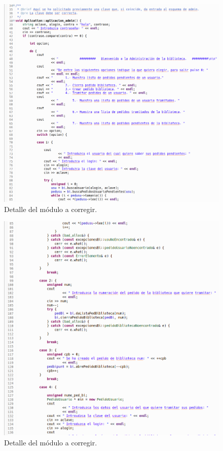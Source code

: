  		\begin{figure}[H]
 			\centering
 			\includegraphics[scale=0.45]{img/captura97.png}
 			\caption{Detalle del módulo a corregir.}
 			\label{captura97}
 		\end{figure}
 	
 		\begin{figure}[H]
 			\centering
 			\includegraphics[scale=0.45]{img/captura98.png}
 			\caption{Detalle del módulo a corregir.}
 			\label{captura98}
 		\end{figure}
 	

